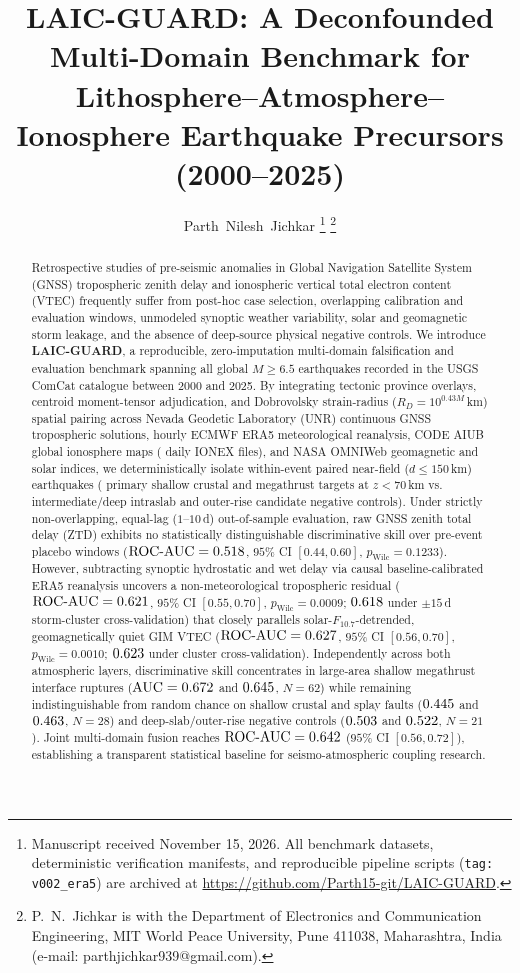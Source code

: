 ﻿\documentclass[journal]{IEEEtran}
\title{LAIC-GUARD: A Deconfounded Multi-Domain Benchmark for Lithosphere--Atmosphere--Ionosphere Earthquake Precursors (2000--2025)}
\author{Parth~Nilesh~Jichkar%
\thanks{Manuscript received November 15, 2026. All benchmark datasets, deterministic verification manifests, and reproducible pipeline scripts (\texttt{tag: v002\_era5}) are archived at \url{https://github.com/Parth15-git/LAIC-GUARD}.}%
\thanks{P.~N.~Jichkar is with the Department of Electronics and Communication Engineering, MIT World Peace University, Pune 411038, Maharashtra, India (e-mail: parthjichkar939@gmail.com).}}
\begin{document}
\maketitle

\begin{abstract}
Retrospective studies of pre-seismic anomalies in Global Navigation Satellite System (GNSS) tropospheric zenith delay and ionospheric vertical total electron content (VTEC) frequently suffer from post-hoc case selection, overlapping calibration and evaluation windows, unmodeled synoptic weather variability, solar and geomagnetic storm leakage, and the absence of deep-source physical negative controls. We introduce \textbf{LAIC-GUARD}, a reproducible, zero-imputation multi-domain falsification and evaluation benchmark spanning all \LgTotalGlobalEvents{} global $M \ge 6.5$ earthquakes recorded in the USGS ComCat catalogue between 2000 and 2025. By integrating tectonic province overlays, centroid moment-tensor adjudication, and Dobrovolsky strain-radius ($R_D = 10^{0.43M}$\,km) spatial pairing across Nevada Geodetic Laboratory (UNR) continuous GNSS tropospheric solutions, hourly ECMWF ERA5 meteorological reanalysis, CODE AIUB global ionosphere maps (\LgIonexMapsIngested{} daily IONEX files), and NASA OMNIWeb geomagnetic and solar indices, we deterministically isolate \LgPairedTierOneTotal{} within-event paired near-field ($d \le 150$\,km) earthquakes (\LgPairedShallowMain{} primary shallow crustal and megathrust targets at $z < 70$\,km vs.\ \LgPairedNullCtrlMain{} intermediate/deep intraslab and outer-rise candidate negative controls). Under strictly non-overlapping, equal-lag ($1\text{--}10$\,d) out-of-sample evaluation, raw GNSS zenith total delay (ZTD) exhibits no statistically distinguishable discriminative skill over pre-event placebo windows ($\text{ROC-AUC} = 0.518$, $95\%$ CI $[0.44, 0.60]$, $p_{\text{Wilc}} = 0.1233$). However, subtracting synoptic hydrostatic and wet delay via causal baseline-calibrated ERA5 reanalysis uncovers a non-meteorological tropospheric residual ($\text{ROC-AUC} = 0.621$, $95\%$ CI $[0.55, 0.70]$, $p_{\text{Wilc}} = 0.0009$; $0.618$ under $\pm 15$\,d storm-cluster cross-validation) that closely parallels solar-$F_{10.7}$-detrended, geomagnetically quiet GIM VTEC ($\text{ROC-AUC} = 0.627$, $95\%$ CI $[0.56, 0.70]$, $p_{\text{Wilc}} = 0.0010$; $0.623$ under cluster cross-validation). Independently across both atmospheric layers, discriminative skill concentrates in large-area shallow megathrust interface ruptures ($\text{AUC} = 0.672$ and $0.645$, $N=62$) while remaining indistinguishable from random chance on shallow crustal and splay faults ($0.445$ and $0.463$, $N=28$) and deep-slab/outer-rise negative controls ($0.503$ and $0.522$, $N=21$). Joint multi-domain fusion reaches $\text{ROC-AUC} = 0.642$ ($95\%$ CI $[0.56, 0.72]$), establishing a transparent statistical baseline for seismo-atmospheric coupling research.
\end{abstract}
\end{document}

